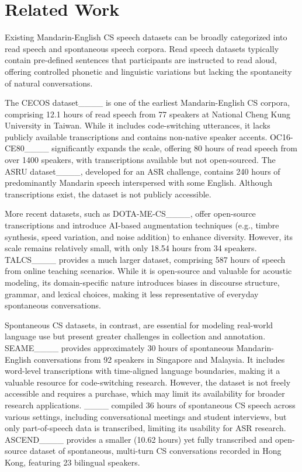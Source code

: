 \section{Related Work}
Existing Mandarin-English CS speech datasets can be broadly categorized into read speech and spontaneous speech corpora. Read speech datasets typically contain pre-defined sentences that participants are instructed to read aloud, offering controlled phonetic and linguistic variations but lacking the spontaneity of natural conversations.  

The CECOS dataset____ is one of the earliest Mandarin-English CS corpora, comprising 12.1 hours of read speech from 77 speakers at National Cheng Kung University in Taiwan. While it includes code-switching utterances, it lacks publicly available transcriptions and contains non-native speaker accents. OC16-CE80____ significantly expands the scale, offering 80 hours of read speech from over 1400 speakers, with transcriptions available but not open-sourced. The ASRU dataset____, developed for an ASR challenge, contains 240 hours of predominantly Mandarin speech interspersed with some English. Although transcriptions exist, the dataset is not publicly accessible.  

More recent datasets, such as DOTA-ME-CS____, offer open-source transcriptions and introduce AI-based augmentation techniques (e.g., timbre synthesis, speed variation, and noise addition) to enhance diversity. However, its scale remains relatively small, with only 18.54 hours from 34 speakers. TALCS____ provides a much larger dataset, comprising 587 hours of speech from online teaching scenarios. While it is open-source and valuable for acoustic modeling, its domain-specific nature introduces biases in discourse structure, grammar, and lexical choices, making it less representative of everyday spontaneous conversations.  

Spontaneous CS datasets, in contrast, are essential for modeling real-world language use but present greater challenges in collection and annotation. SEAME____ provides approximately 30 hours of spontaneous Mandarin-English conversations from 92 speakers in Singapore and Malaysia. It includes word-level transcriptions with time-aligned language boundaries, making it a valuable resource for code-switching research. However, the dataset is not freely accessible and requires a purchase, which may limit its availability for broader research applications.
____ compiled 36 hours of spontaneous CS speech across various settings, including conversational meetings and student interviews, but only part-of-speech data is transcribed, limiting its usability for ASR research. ASCEND____ provides a smaller (10.62 hours) yet fully transcribed and open-source dataset of spontaneous, multi-turn CS conversations recorded in Hong Kong, featuring 23 bilingual speakers.  

